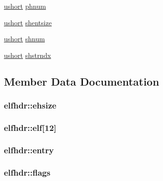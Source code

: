\begin{DoxyCompactItemize}
\hyperlink{types_8h_ab95f123a6c9bcfee6a343170ef8c5f69}{ushort} \hyperlink{structelfhdr_a3eff58d58a3ee83aa53d7ffdebdb6b5b}{phnum}
\item 
\hyperlink{types_8h_ab95f123a6c9bcfee6a343170ef8c5f69}{ushort} \hyperlink{structelfhdr_aeedc5375e3f67e8dda6351e0e80b8e02}{shentsize}
\item 
\hyperlink{types_8h_ab95f123a6c9bcfee6a343170ef8c5f69}{ushort} \hyperlink{structelfhdr_aebf9526933b9f0502bdbafacce3734c1}{shnum}
\item 
\hyperlink{types_8h_ab95f123a6c9bcfee6a343170ef8c5f69}{ushort} \hyperlink{structelfhdr_a84f3d7712c99bfea3f4be42728dc0a0e}{shstrndx}
\end{DoxyCompactItemize}


\subsection{Member Data Documentation}
\subsubsection[{\texorpdfstring{ehsize}{ehsize}}]{ elfhdr\+::ehsize}\hypertarget{structelfhdr_aeffe5743cc720e5795af5d17b6fd6928}{}\label{structelfhdr_aeffe5743cc720e5795af5d17b6fd6928}
\subsubsection[{\texorpdfstring{elf}{elf}}]{ elfhdr\+::elf\mbox{[}12\mbox{]}}\hypertarget{structelfhdr_a22ec6f2383f0488ee18a18673398f201}{}\label{structelfhdr_a22ec6f2383f0488ee18a18673398f201}
\subsubsection[{\texorpdfstring{entry}{entry}}]{ elfhdr\+::entry}\hypertarget{structelfhdr_ad40755e1b2c6efc3ec0ad95889f743a5}{}\label{structelfhdr_ad40755e1b2c6efc3ec0ad95889f743a5}
\subsubsection[{\texorpdfstring{flags}{flags}}]{ elfhdr\+::flags}\hypertarget{structelfhdr_a2f1e0957c83938630ef0ed074830df03}{}\label{structelfhdr_a2f1e0957c83938630ef0ed074830df03}
